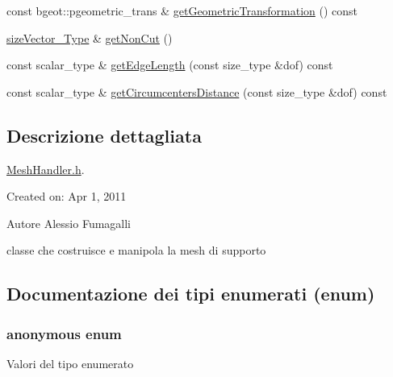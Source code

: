 \begin{DoxyCompactItemize}
const bgeot\-::pgeometric\-\_\-trans \& \hyperlink{classMeshHandler_a57750679882b57b28f65b6e31c3a6aa8}{get\-Geometric\-Transformation} () const 
\item 
\hyperlink{Core_8h_a83c51913d041a5001e8683434c09857f}{size\-Vector\-\_\-\-Type} \& \hyperlink{classMeshHandler_a6b5defc6ac7c8c8c0c1b1c81c6a980e7}{get\-Non\-Cut} ()
\item 
const scalar\-\_\-type \& \hyperlink{classMeshHandler_a32b8f88e589acf24d4430959b9f99b79}{get\-Edge\-Length} (const size\-\_\-type \&dof) const 
\item 
const scalar\-\_\-type \& \hyperlink{classMeshHandler_a616fa00edafb858d897fb64d80c69c15}{get\-Circumcenters\-Distance} (const size\-\_\-type \&dof) const 
\end{DoxyCompactItemize}


\subsection{Descrizione dettagliata}
\hyperlink{MeshHandler_8h}{Mesh\-Handler.\-h}. 

Created on\-: Apr 1, 2011

\begin{DoxyAuthor}{Autore}
Alessio Fumagalli
\end{DoxyAuthor}
classe che costruisce e manipola la mesh di supporto 

\subsection{Documentazione dei tipi enumerati (enum)}
\hypertarget{classMeshHandler_a239707613811024a58eece39a4c9bab3}{\subsubsection[{anonymous enum}]{\setlength{\rightskip}{0pt plus 5cm}anonymous enum}}\label{classMeshHandler_a239707613811024a58eece39a4c9bab3}
\begin{Desc}
\item[Valori del tipo enumerato]\par
\begin{description}
\item[{\em 
\hypertarget{classMeshHandler_a239707613811024a58eece39a4c9bab3afc8bd5152d6d9b425b5e8bf4da8bd617}{U\-N\-C\-U\-T\-\_\-\-R\-E\-G\-I\-O\-N}\label{classMeshHandler_a239707613811024a58eece39a4c9bab3afc8bd5152d6d9b425b5e8bf4da8bd617}
}]\end{description}
\end{Desc}

